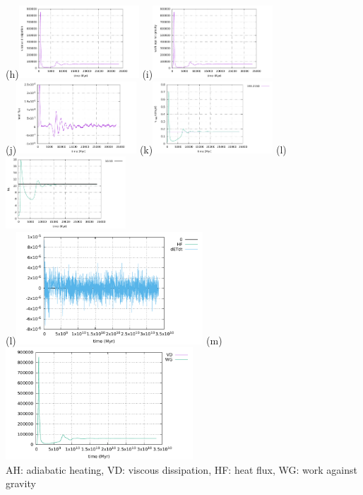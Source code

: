 \begin{center}
(h)\includegraphics[width=4.5cm]{python_codes/fieldstone_compressible2/BA_105/viscous_dissipation}
(i)\includegraphics[width=4.5cm]{python_codes/fieldstone_compressible2/BA_105/work_grav}\\
(j)\includegraphics[width=4.5cm]{python_codes/fieldstone_compressible2/BA_105/heat_flux}
(k)\includegraphics[width=4.5cm]{python_codes/fieldstone_compressible2/BA_105/vrms}
(l)\includegraphics[width=4.5cm]{python_codes/fieldstone_compressible2/BA_105/Nu}\\
(l)\includegraphics[width=7cm]{python_codes/fieldstone_compressible2/BA_105/conservation1}
(m)\includegraphics[width=7cm]{python_codes/fieldstone_compressible2/BA_105/conservation2}\\
AH: adiabatic heating, VD: viscous dissipation, HF: heat flux, WG: work against gravity
\end{center}

